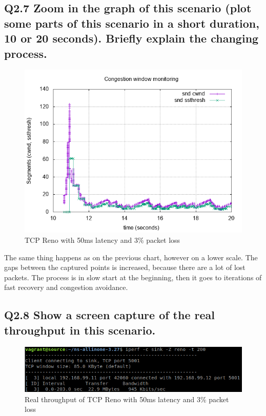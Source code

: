 \documentclass{article}
\begin{document}
\newpage

\subsection{Q2.7 Zoom in the graph of this scenario (plot some parts of
this scenario in a short duration, 10 or 20 seconds). Briefly explain
the changing process.}

\begin{figure}[h]
    \centering
    \includegraphics[scale=0.6]{images/lab1-group11-task2-question7.png}
    \caption{TCP Reno with 50ms latency and 3\% packet loss}
    \label{fig:lab1-group11-task2-question7}
\end{figure}

The same thing happens as on the previous chart, however on a lower scale. The gaps between the captured points is increased, because there are a lot of lost packets. The process is in slow start at the beginning, then it goes to iterations of fast recovery and congestion avoidance.

\subsection{Q2.8 Show a screen capture of the real throughput in this
scenario.}

\begin{figure}[h]
    \centering
    \includegraphics[scale=0.6]{images/lab1-group11-task2-question8.png}
    \caption{Real throughput of TCP Reno with 50ms latency and 3\% packet loss }
    \label{fig:lab1-group11-task2-question8}
\end{figure}
\end{document}

